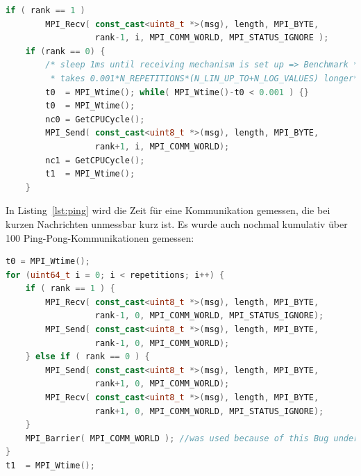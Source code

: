 \documentclass[12pt,a4paper]{article}
\begin{document}
\begin{center}\begin{minipage}{0.75\linewidth}\begin{lstlisting}[language=C++, caption={Ping-Kommunikation implementiert in C++. MPI_Send blockt bis die Daten das Ziel erreicht haben!}, label=lst:ping]
	if ( rank == 1 )
	    MPI_Recv( const_cast<uint8_t *>(msg), length, MPI_BYTE, 
	              rank-1, i, MPI_COMM_WORLD, MPI_STATUS_IGNORE );
	if (rank == 0) {
        /* sleep 1ms until receiving mechanism is set up => Benchmark *
         * takes 0.001*N_REPETITIONS*(N_LIN_UP_TO+N_LOG_VALUES) longer*/
        t0  = MPI_Wtime(); while( MPI_Wtime()-t0 < 0.001 ) {}
        t0  = MPI_Wtime();
        nc0 = GetCPUCycle();
        MPI_Send( const_cast<uint8_t *>(msg), length, MPI_BYTE,
                  rank+1, i, MPI_COMM_WORLD);
        nc1 = GetCPUCycle();
        t1  = MPI_Wtime();
	}
\end{lstlisting}\end{minipage}\end{center}

In Listing~\ref{lst:ping} wird die Zeit für eine Kommunikation gemessen, die bei kurzen Nachrichten unmessbar kurz ist. Es wurde auch nochmal kumulativ über 100 Ping-Pong-Kommunikationen gemessen:\\

\begin{center}\begin{minipage}{0.75\linewidth}\begin{lstlisting}[language=C++, caption={Kumulative Zeitmessunf für 100 Ping-Pong-Kommunikationen}, label=lst:ping-pong]
t0 = MPI_Wtime();
for (uint64_t i = 0; i < repetitions; i++) {
    if ( rank == 1 ) {
        MPI_Recv( const_cast<uint8_t *>(msg), length, MPI_BYTE,
                  rank-1, 0, MPI_COMM_WORLD, MPI_STATUS_IGNORE);
        MPI_Send( const_cast<uint8_t *>(msg), length, MPI_BYTE,
                  rank-1, 0, MPI_COMM_WORLD);
    } else if ( rank == 0 ) {
        MPI_Send( const_cast<uint8_t *>(msg), length, MPI_BYTE,
                  rank+1, 0, MPI_COMM_WORLD);
        MPI_Recv( const_cast<uint8_t *>(msg), length, MPI_BYTE,
                  rank+1, 0, MPI_COMM_WORLD, MPI_STATUS_IGNORE);
    }
    MPI_Barrier( MPI_COMM_WORLD ); //was used because of this Bug under Windows and Cygwin: http://www.open-mpi.org/community/lists/users/2014/10/25606.php
}
t1  = MPI_Wtime();

\end{lstlisting}\end{minipage}\end{center}
\end{document}
